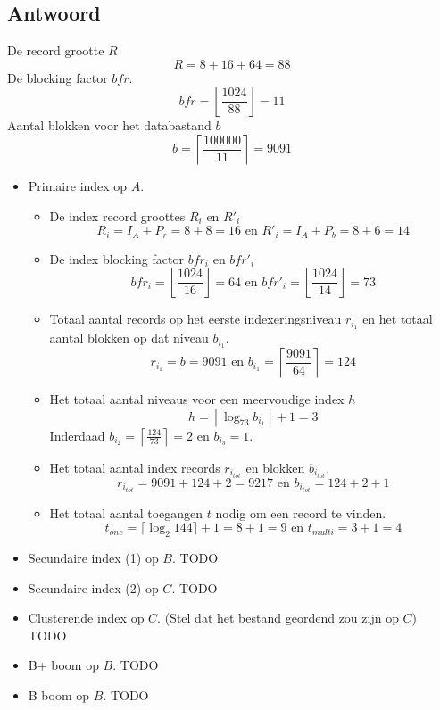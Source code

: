\documentclass[indexstructuren.tex]{subfiles}
\begin{document}
\subsection*{Antwoord}
De record grootte $R$
\[
R = 8 + 16 + 64 = 88
\]
De blocking factor $bfr$.
\[
bfr = \left\lfloor\frac{1024}{88}\right\rfloor = 11
\]
Aantal blokken voor het databastand $b$
\[
b = \left\lceil \frac{100000}{11} \right\rceil  = 9091
\]
\begin{itemize}
\item Primaire index op $A$.
\begin{itemize}
\item De index record groottes $R_i$ en $R'_i$
\[
R_i = I_A + P_r = 8 + 8 = 16 \text{ en } R'_i = I_{A} + P_b = 8 + 6 = 14
\]
\item De index blocking factor $bfr_i$ en $bfr'_i$
\[
bfr_{i} = \left\lfloor\frac{1024}{16}\right\rfloor = 64 \text{ en }bfr'_{i} = \left\lfloor\frac{1024}{14}\right\rfloor = 73
\]
\item Totaal aantal records op het eerste indexeringsniveau $r_{i_{1}}$ en het totaal aantal blokken op dat niveau $b_{i_{1}}$.
\[
r_{i_{1}} = b = 9091 \text{ en } b_{i_{1}} = \left\lceil\frac{9091}{64} \right\rceil = 124
\]
\item Het totaal aantal niveaus voor een meervoudige index $h$
\[
h = \left\lceil \log_{73}b_{i_{1}} \right\rceil +1= 3
\]
Inderdaad $b_{i_{2}} = \left\lceil \frac{124}{73} \right\rceil = 2$ en $b_{i_{3}} = 1$.
\item Het totaal aantal index records $r_{i_{tot}}$ en blokken $b_{i_{tot}}$.
\[
r_{i_{tot}} = 9091 + 124 + 2 = 9217 \text{ en } b_{i_{tot}} = 124 + 2 +1
\]
\item Het totaal aantal toegangen $t$ nodig om een record te vinden.
\[
t_{one} = \lceil \log_{2} 144\rceil + 1 = 8+1 = 9 \text{ en } t_{multi} = 3 + 1 = 4 
\]
\end{itemize}
\item Secundaire index (1) op $B$.
TODO
\item Secundaire index (2) op $C$.
TODO
\item Clusterende index op $C$. (Stel dat het bestand geordend zou zijn op $C$)
TODO
\item B+ boom op $B$.
TODO
\item B boom op $B$.
TODO
\end{itemize}
\end{document}
